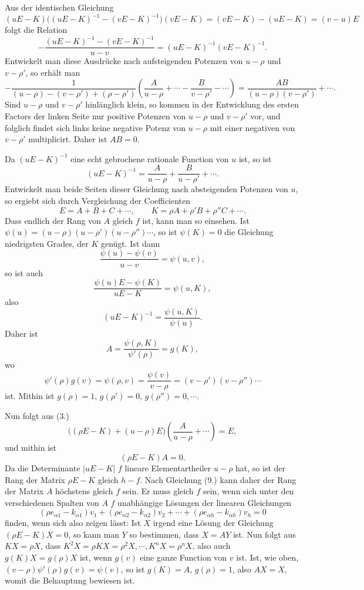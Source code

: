 \documentclass[11pt]{article}
\begin{document}
Aus der identischen Gleichung
\[
(uE-K)\bigl((uE-K)^{-1}-(vE-K)^{-1}\bigr)(vE-K)=(vE-K)-(uE-K)=(v-u)E
\]
folgt die Relation
\[
-\frac{(uE-K)^{-1}-(vE-K)^{-1}}{u-v}=(uE-K)^{-1}(vE-K)^{-1}.
\]
Entwickelt man diese Ausdrücke nach aufsteigenden Potenzen von $u-\rho$ und $v-\rho'$, so erhält man
\[
-\frac{1}{(u-\rho)-(v-\rho')+(\rho-\rho')}
\left(\frac{A}{u-\rho}+\cdots-\frac{B}{v-\rho'}-\cdots\right)
=\frac{AB}{(u-\rho)(v-\rho')}+\cdots.
\]
Sind $u-\rho$ und $v-\rho'$ hinlänglich klein, so kommen in der Entwicklung des ersten Factors der linken Seite nur positive Potenzen von $u-\rho$ und $v-\rho'$ vor, und folglich findet sich links keine negative Potenz von $u-\rho$ mit einer negativen von $v-\rho'$ multiplicirt. Daher ist $AB=0$.

Da $(uE-K)^{-1}$ eine echt gebrochene rationale Function von $u$ ist, so ist
\begin{equation}\tag{7.}
(uE-K)^{-1}=\frac{A}{u-\rho}+\frac{B}{u-\rho'}+\cdots.
\end{equation}
Entwickelt man beide Seiten dieser Gleichung nach absteigenden Potenzen von $u$, so ergiebt sich durch Vergleichung der Coefficienten
\begin{equation}\tag{8.}
E=A+B+C+\cdots,
\qquad
K=\rho A+\rho'B+\rho''C+\cdots.
\end{equation}
Dass endlich der Rang von $A$ gleich $f$ ist, kann man so einsehen. Ist $\psi(u)=(u-\rho)(u-\rho')(u-\rho'')\cdots$, so ist $\psi(K)=0$ die Gleichung niedrigsten Grades, der $K$ genügt. Ist dann
\[
\frac{\psi(u)-\psi(v)}{u-v}=\psi(u,v),
\]
so ist auch
\[
\frac{\psi(u)E-\psi(K)}{uE-K}=\psi(u,K),
\]
also
\[
(uE-K)^{-1}=\frac{\psi(u,K)}{\psi(u)}.
\]
Daher ist
\[
A=\frac{\psi(\rho,K)}{\psi'(\rho)}=g(K),
\]
wo
\[
\psi'(\rho)g(v)=\psi(\rho,v)=\frac{\psi(v)}{v-\rho}=(v-\rho')(v-\rho'')\cdots
\]
ist. Mithin ist $g(\rho)=1$, $g(\rho')=0$, $g(\rho'')=0,\cdots$.

Nun folgt aus (3.)
\[
\bigl((\rho E-K)+(u-\rho)E\bigr)\left(\frac{A}{u-\rho}+\cdots\right)=E,
\]
und mithin ist
\begin{equation}\tag{9.}
(\rho E-K)A=0.
\end{equation}
Da die Determinante $|uE-K|$ $f$ lineare Elementartheiler $u-\rho$ hat, so ist der Rang der Matrix $\rho E-K$ gleich $h-f$. Nach Gleichung (9.) kann daher der Rang der Matrix $A$ höchstens gleich $f$ sein. Er muss gleich $f$ sein, wenn sich unter den verschiedenen Spalten von $A$ $f$ unabhängige Lösungen der linearen Gleichungen
\[
(\rho e_{\alpha1}-k_{\alpha1})v_1+(\rho e_{\alpha2}-k_{\alpha2})v_2+\cdots+(\rho e_{\alpha h}-k_{\alpha h})v_h=0
\]
finden, wenn sich also zeigen lässt: Ist $X$ irgend eine Lösung der Gleichung $(\rho E-K)X=0$, so kann man $Y$ so bestimmen, dass $X=AY$ ist. Nun folgt aus $KX=\rho X$, dass $K^2X=\rho KX=\rho^2X,\cdots,K^nX=\rho^nX$, also auch $g(K)X=g(\rho)X$ ist, wenn $g(v)$ eine ganze Function von $v$ ist. Ist, wie oben, $(v-\rho)\psi'(\rho)g(v)=\psi(v)$, so ist $g(K)=A$, $g(\rho)=1$, also $AX=X$, womit die Behauptung bewiesen ist.
\end{document}
